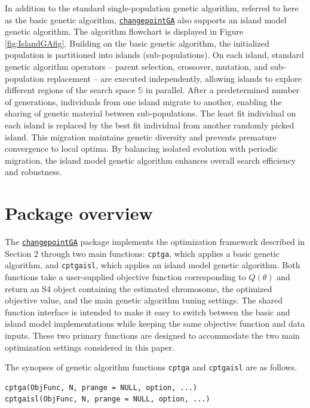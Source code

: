 In addition to the standard single-population genetic algorithm, referred to here as the basic genetic algorithm, \href{https://CRAN.R-project.org/package=changepointGA}{\texttt{changepointGA}} also supports an island model genetic algorithm. The algorithm flowchart is displayed in Figure \ref{fig:IslandGAfig}. Building on the basic genetic algorithm, the initialized population is partitioned into islands (sub-populations). On each island, standard genetic algorithm operators -- parent selection, crossover, mutation, and sub-population replacement -- are executed independently, allowing islands to explore different regions of the search space \(\mathbb{S}\) in parallel. After a predetermined number of generations, individuals from one island migrate to another, enabling the sharing of genetic material between sub-populations. The least fit individual on each island is replaced by the best fit individual from another randomly picked island. This migration maintains genetic diversity and prevents premature convergence to local optima. By balancing isolated evolution with periodic migration, the island model genetic algorithm enhances overall search efficiency and robustness.

\section{Package overview}\label{package-overview}

The \href{https://CRAN.R-project.org/package=changepointGA}{\texttt{changepointGA}} package implements the optimization framework described in Section 2 through two main functions: \texttt{cptga}, which applies a basic genetic algorithm, and \texttt{cptgaisl}, which applies an island model genetic algorithm. Both functions take a user-supplied objective function corresponding to \(Q(\theta)\) and return an S4 object containing the estimated chromosome, the optimized objective value, and the main genetic algorithm tuning settings. The shared function interface is intended to make it easy to switch between the basic and island model implementations while keeping the same objective function and data inputs. These two primary functions are designed to accommodate the two main optimization settings considered in this paper.

The synopses of genetic algorithm functions \texttt{cptga} and \texttt{cptgaisl} are as follows.

\begin{verbatim}
cptga(ObjFunc, N, prange = NULL, option, ...)
cptgaisl(ObjFunc, N, prange = NULL, option, ...)
\end{verbatim}

